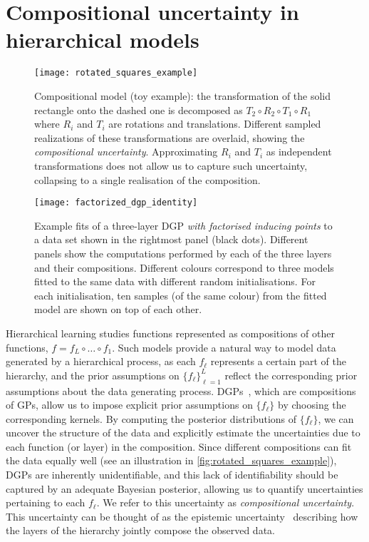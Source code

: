 \section{Compositional uncertainty in hierarchical models}
\begin{figure}[t]
    \centering
    \texttt{[image: rotated\_squares\_example]}
    \caption{
        \label{fig:composition:rotated_squares_example}
        Compositional model (toy example): the transformation of the solid rectangle onto the dashed one is decomposed as $T_2 \circ R_2 \circ T_1 \circ R_1$ where $R_i$ and $T_i$ are rotations and translations.
        Different sampled realizations of these transformations are overlaid, showing the \emph{compositional uncertainty}.
        Approximating $R_i$ and $T_i$ as independent transformations does not allow us to capture such uncertainty, collapsing to a single realisation of the composition.
    }
\end{figure}
\begin{figure}[t]
    \centering
    \texttt{[image: factorized\_dgp\_identity]}
    \caption{
        \label{fig:composition:identity_factorised}
        Example fits of a three-layer DGP \emph{with factorised inducing points} to a data set shown in the rightmost panel (black dots).
        Different panels show the computations performed by each of the three layers and their compositions.
        Different colours correspond to three models fitted to the same data with different random initialisations.
        For each initialisation, ten samples (of the same colour) from the fitted model are shown on top of each other.
    }
\end{figure}
Hierarchical learning studies functions represented as compositions of other functions, $f = f_L \circ \ldots \circ f_1$.
Such models provide a natural way to model data generated by a hierarchical process, as each $f_\ell$ represents a certain part of the hierarchy, and the prior assumptions on $\{f_\ell\}_{\ell=1}^{L}$ reflect the corresponding prior assumptions about the data generating process.
DGPs~\parencite{Damianou:2013}, which are compositions of GPs, allow us to impose explicit prior assumptions on $\{f_\ell\}$ by choosing the corresponding kernels.
By computing the posterior distributions of $\{f_\ell\}$, we can uncover the structure of the data and explicitly estimate the uncertainties due to each function (or layer) in the composition.
Since different compositions can fit the data equally well (see an illustration in \cref{fig:rotated_squares_example}), DGPs are inherently unidentifiable, and this lack of identifiability should be captured by an adequate Bayesian posterior, allowing us to quantify uncertainties pertaining to each $f_\ell$.
We refer to this uncertainty as \emph{compositional uncertainty}. This uncertainty can be thought of as the epistemic uncertainty~\parencite{Gal:2016} describing how the layers of the hierarchy jointly compose the observed data.

